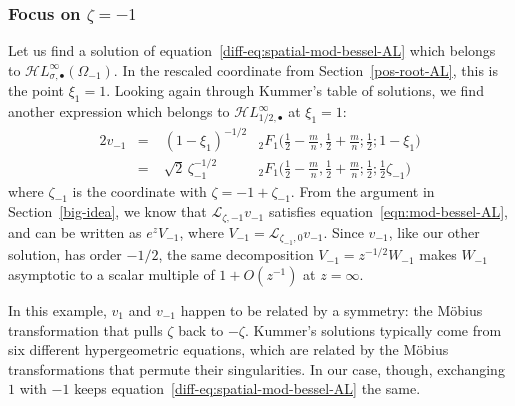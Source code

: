 \documentclass{article}
\newcommand{\singexp}[2]{\mathcal{H}L^\infty_{#1, #2}}
\newcommand{\singexpalg}[1]{\singexp{#1}{\bullet}}
\newcommand{\laplace}{\mathcal{L}}
\theoremstyle{definition}
\theoremstyle{plain}
\begin{document}
\subsubsection{Focus on $\zeta = -1$}\label{neg-root-AL}
Let us find a solution of equation~\eqref{diff-eq:spatial-mod-bessel-AL} which belongs to $\singexpalg{\sigma}(\Omega_{-1})$. In the rescaled coordinate from Section~\ref{pos-root-AL}, this is the point $\xi_1 = 1$. Looking again through Kummer's table of solutions, we find another expression \cite[formula~15.10.14]{dlmf} which belongs to $\singexpalg{1/2}$ at $\xi_1 = 1$:
\begin{alignat*}{2}
v_{-1} &=\;& (1-\xi_1)^{-1/2} & {}_2F_1\big(\tfrac{1}{2}-\tfrac{m}{n}, \tfrac{1}{2}+\tfrac{m}{n}; \tfrac{1}{2}; 1-\xi_1\big) \\
&=\;& \sqrt{2}\,\zeta_{-1}^{-1/2} & {}_2F_1\big(\tfrac{1}{2}-\tfrac{m}{n}, \tfrac{1}{2}+\tfrac{m}{n}; \tfrac{1}{2}; \tfrac{1}{2}\zeta_{-1}\big)
\end{alignat*}
where $\zeta_{-1}$ is the coordinate with $\zeta = -1 + \zeta_{-1}$. From the argument in Section~\ref{big-idea}, we know that $\laplace_{\zeta, -1} v_{-1}$ satisfies equation~\eqref{eqn:mod-bessel-AL}, and can be written as $e^z V_{-1}$, where $V_{-1} = \laplace_{\zeta_{-1}, 0} v_{-1}$. Since $v_{-1}$, like our other solution, has order $-1/2$, the same decomposition $V_{-1} = z^{-1/2} W_{-1}$ makes $W_{-1}$ asymptotic to a scalar multiple of $1+O(z^{-1})$ at $z = \infty$.

In this example, $v_1$ and $v_{-1}$ happen to be related by a symmetry: the M\"{o}bius transformation that pulls $\zeta$ back to $-\zeta$. Kummer's solutions typically come from six different hypergeometric equations, which are related by the M\"{o}bius transformations that permute their singularities. In our case, though, exchanging $1$ with $-1$ keeps equation~\eqref{diff-eq:spatial-mod-bessel-AL} the same.
\end{document}
